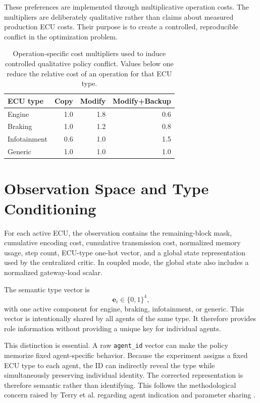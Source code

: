 \documentclass{iutbscthesis}
\begin{document}
These preferences are implemented through multiplicative operation costs. The multipliers are deliberately qualitative rather than claims about measured production ECU costs. Their purpose is to create a controlled, reproducible conflict in the optimization problem.

\begin{table}[H]
\centering
\small
\begin{tabular}{lrrr}
\toprule
ECU type & Copy & Modify & Modify+Backup\\
\midrule
Engine & 1.0 & 1.8 & 0.6\\
Braking & 1.0 & 1.2 & 0.8\\
Infotainment & 0.6 & 1.0 & 1.5\\
Generic & 1.0 & 1.0 & 1.0\\
\bottomrule
\end{tabular}
\caption{Operation-specific cost multipliers used to induce controlled qualitative policy conflict. Values below one reduce the relative cost of an operation for that ECU type.}
\label{tab:multipliers}
\end{table}

\section{Observation Space and Type Conditioning}
For each active ECU, the observation contains the remaining-block mask, cumulative encoding cost, cumulative transmission cost, normalized memory usage, step count, ECU-type one-hot vector, and a global state representation used by the centralized critic. In coupled mode, the global state also includes a normalized gateway-load scalar.

The semantic type vector is
\begin{equation}
\mathbf{e}_i\in\{0,1\}^{4},
\end{equation}
with one active component for engine, braking, infotainment, or generic. This vector is intentionally shared by all agents of the same type. It therefore provides role information without providing a unique key for individual agents.

This distinction is essential. A raw \texttt{agent\_id} vector can make the policy memorize fixed agent-specific behavior. Because the experiment assigns a fixed ECU type to each agent, the ID can indirectly reveal the type while simultaneously preserving individual identity. The corrected representation is therefore semantic rather than identifying. This follows the methodological concern raised by Terry et al. regarding agent indication and parameter sharing \parencite{terry2020revisiting}.
\end{document}
